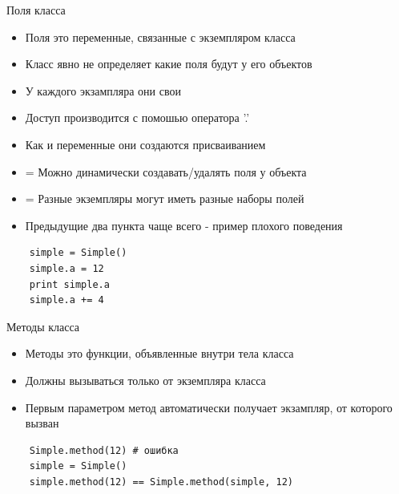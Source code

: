 \documentclass{article}
\begin{document}
\begin{center} Поля класса \end{center}
\begin{itemize}
    \item Поля это переменные, связанные с экземпляром класса
    \item Класс явно не определяет какие поля будут у его объектов
    \item У каждого экзампляра они свои
    \item Доступ производится с помошью оператора '.'
    \item Как и переменные они создаются присваиванием
    \item = Можно динамически создавать/удалять поля у объекта
    \item = Разные экземпляры могут иметь разные наборы полей
    \item Предыдущие два пункта чаще всего - пример плохого поведения
\end{itemize}
\begin{lstlisting}
    simple = Simple()
    simple.a = 12
    print simple.a
    simple.a += 4
\end{lstlisting}
\newpage

\begin{center} Методы класса\end{center}
\begin{itemize}
    \item Методы это функции, объявленные внутри тела класса
    \item Должны вызываться только от экземпляра класса
    \item Первым параметром метод автоматически получает экзампляр, от которого вызван
\end{itemize}

\begin{lstlisting}
    Simple.method(12) # ошибка
    simple = Simple()
    simple.method(12) == Simple.method(simple, 12)
\end{lstlisting}

\newpage
\end{document}
